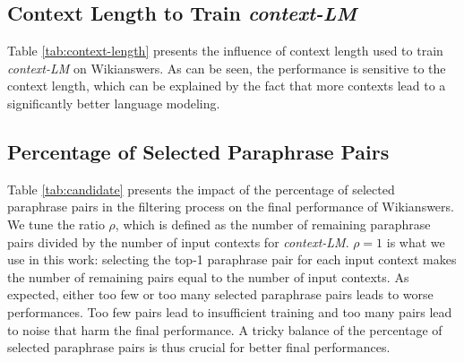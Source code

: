 \documentclass[11pt,a4paper]{article}
\begin{document}
\begin{table}
    \centering
    \small
    \caption{The effect of data size for training {\it context-LM}. The iBLEU score is reported on Wikianswers.}
    \label{tab:size}
\end{table}

\begin{table}
    \centering
    \small
    \caption{The effect of context length for  {\it context-LM}. The iBLEU score is reported on Wikianswers.}
    \label{tab:context-length}
\end{table}
\subsection{Context Length to Train {\it context-LM}}
Table \ref{tab:context-length} presents the influence of context length used to train  {\it context-LM} on Wikianswers.
As can be seen, the performance is sensitive to the context length, which can be explained by the fact that more contexts lead to a significantly better language modeling. 

\subsection{Percentage of Selected Paraphrase Pairs}
Table \ref{tab:candidate}
presents
 the impact of  the percentage of selected paraphrase pairs in the filtering process on the final performance of Wikianswers. 
 We tune the ratio $\rho$, which is defined as the number of remaining paraphrase pairs  divided by the number of input contexts for {\it context-LM}. $\rho=1$ is what we use in this work: selecting the top-1 paraphrase pair for each input context makes the number of remaining pairs equal to the number of input contexts. 
As expected, either too few or too many selected paraphrase pairs  leads to worse performances.  Too few pairs lead to  insufficient training and too many pairs lead to noise that harm the final performance. 
A tricky balance of the percentage of selected paraphrase pairs is thus crucial for better final performances.
\end{document}
